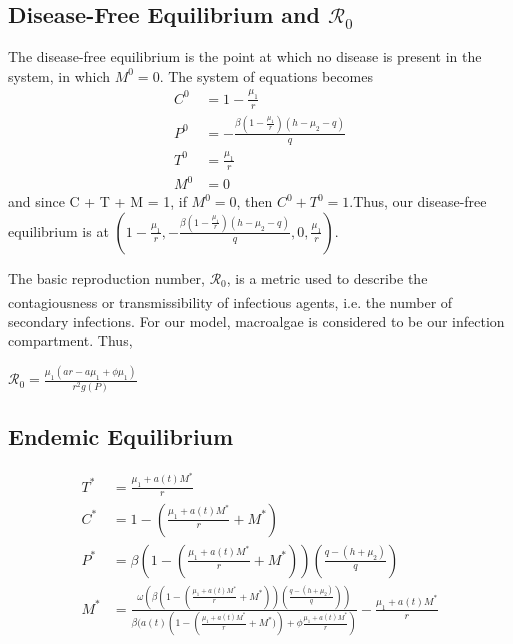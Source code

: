 \documentclass[12pt]{article}
\begin{document}
\subsection{Disease-Free Equilibrium and $\mathscr{R}_{0}$}
The disease-free equilibrium is the point at which no disease is present in the system, in which $M^{0} = 0$. The system of equations becomes
\begin{align*}
        C^{0} &= 1 - \frac{\mu_{1}}{r}\\
        P^{0} &= -\frac{\beta(1 - \frac{\mu_{1}}{r})(h - \mu_{2} - q)}{q}\\
        T^{0} &= \frac{\mu_{1}}{r}\\
        M^{0} &= 0 
\end{align*}
and since C + T + M = 1, if $M^{0} = 0$, then $C^{0} + T^{0} = 1$.Thus, our disease-free equilibrium is at $(1 - \frac{\mu_{1}}{r}, -\frac{\beta(1 - \frac{\mu_{1}}{r})(h - \mu_{2} - q)}{q}, 0, \frac{\mu_{1}}{r})$.

The basic reproduction number, $\mathscr{R}_{0}$, is a metric used to describe the contagiousness or transmissibility of infectious agents\textsuperscript{\cite{delamater_street_leslie_yang_jacobsen_2019}}, i.e. the number of secondary infections. For our model, macroalgae is considered to be our infection compartment. Thus, 

\begin{center}

$\displaystyle {\mathscr{R}}_{0} = \frac{\mu_{1}(a r - a\mu_{1} + \phi \mu_{1})}{r^{2}g(P)}$

\end{center}

\subsection{Endemic Equilibrium}
\begin{align*}
        T^{*} &= \frac{\mu_{1} + a(t)M^{*}}{r} \\
        C^{*} %
        &= 1- \left(\frac{\mu_{1} + a(t)M^{*}}{r} + M^{*} \right)\\
        P^{*} %
        &= \beta \left(1- \left(\frac{\mu_{1} + a(t)M^{*}}{r} + M^{*} \right) \right) \left(\frac{q-(h+\mu_{2})}{q} \right)\\
        M^{*} &= \frac{\omega (\beta \left(1- \left(\frac{\mu_{1} + a(t)M^{*}}{r} + M^{*} \right) \right) \left(\frac{q-(h+\mu_{2})}{q} \right))}{\beta(a(t)(1- \left(\frac{\mu_{1} + a(t)M^{*}}{r} + M^{*}) \right)+\phi \frac{\mu_{1} + a(t)M^{*}}{r})} - \frac{\mu_{1} + a(t)M^{*}}{r} \\
\end{align*}
\end{document}
